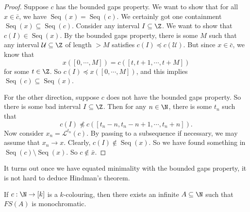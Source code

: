\documentclass[a4paper]{article}
\DeclareMathOperator\Seq{Seq}
\begin{document}
\begin{proof}
  Suppose $c$ has the bounded gaps property. We want to show that for all $x \in \bar{c}$, we have $\Seq(x) = \Seq(c)$. We certainly got one containment $\Seq(x) \subseteq \Seq(c)$. Consider any interval $I \subseteq \Z$. We want to show that $c(I) \in \Seq(x)$. By the bounded gaps property, there is some $M$ such that any interval $\mathcal{U} \subseteq \Z$ of length $> M$ satisfies $c(I) \preccurlyeq c(\mathcal{U})$. But since $x \in \bar{c}$, we know that
  \[
    x([0, \cdots, M]) = c([t, t+ 1, \cdots, t + M])
  \]
  for some $t \in \Z$. So $c(I) \preccurlyeq x([0, \cdots, M])$, and this implies $\Seq(c) \subseteq \Seq (x)$.

  For the other direction, suppose $c$ does not have the bounded gaps property. So there is some bad interval $I \subseteq \Z$. Then for any $n \in \N$, there is some $t_n$ such that
  \[
    c(I) \not \preccurlyeq c([t_n - n, t_n - n + 1, \cdots, t_n + n]).
  \]
  Now consider $x_n = \mathcal{L}^{t_n}(c)$. By passing to a subsequence if necessary, we may assume that $x_n \to x$. Clearly, $c(I) \not\in \Seq(x)$. So we have found something in $\Seq(c) \setminus \Seq(x)$. So $c \not \in \bar{x}$.
\end{proof}
It turns out once we have equated minimality with the bounded gaps property, it is not hard to deduce Hindman's theorem.
\begin{thm}
  If $c: \N \to [k]$ is a $k$-colouring, then there exists an infinite $A \subseteq \N$ such that $FS(A)$ is monochromatic.
\end{thm}
\end{document}
